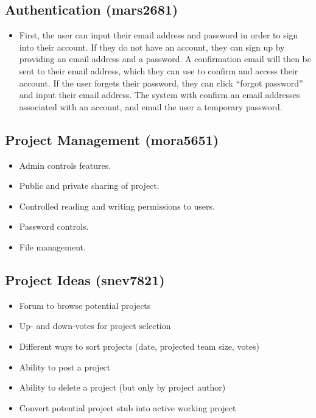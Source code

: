 \documentclass[11pt]{report}
\begin{document}
    \subsection{Authentication (mars2681)}
        \begin{itemize}
            \item First, the user can input their email address and password in order to sign into their account. If they do not have an account, they can sign up by providing an email address and a password. A confirmation email will then be sent to their email address, which they can use to confirm and access their account. If the user forgets their password, they can click “forgot password” and input their email address. The system with confirm an email addresses associated with an account, and email the user a temporary password. 
        \end{itemize}
    \subsection{Project Management (mora5651)}
        \begin{itemize}
            \item Admin controls features.  
            \item Public and private sharing of project.
            \item Controlled reading and writing permissions to users. 
            \item Password controls. 
            \item File management. 
        \end{itemize}
    \subsection{Project Ideas (snev7821)}
        \begin{itemize}
            \item Forum to browse potential projects
            \item Up- and down-votes for project selection
            \item Different ways to sort projects (date, projected team size, votes)
            \item Ability to post a project
            \item Ability to delete a project (but only by project author)
            \item Convert potential project stub into active working project 
        \end{itemize}
\end{document}
